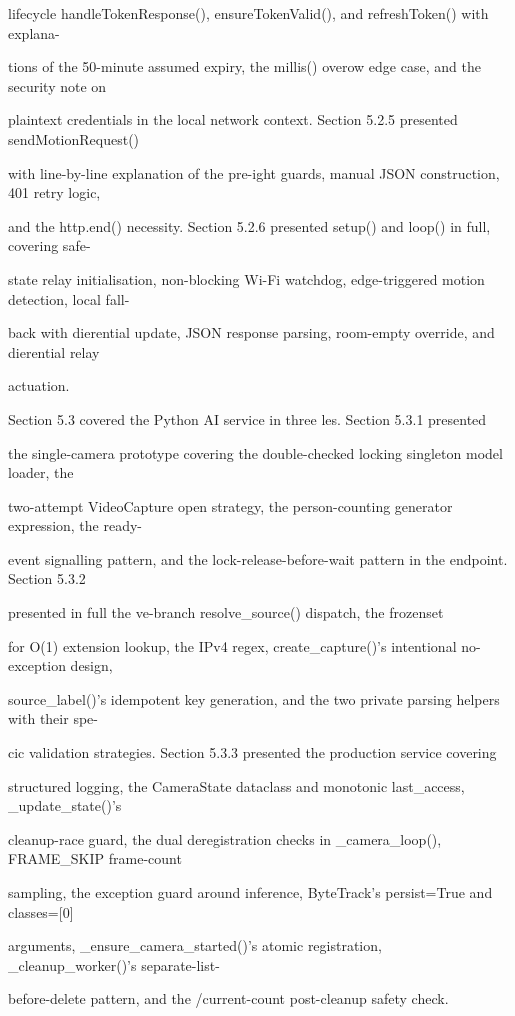 lifecycle  handleTokenResponse(), ensureTokenValid(), and refreshToken()  with explana-

tions of the 50-minute assumed expiry, the millis() overow edge case, and the security note on

plaintext credentials in the local network context. Section 5.2.5 presented sendMotionRequest()

with line-by-line explanation of the pre-ight guards, manual JSON construction, 401 retry logic,

and the http.end() necessity. Section 5.2.6 presented setup() and loop() in full, covering safe-

state relay initialisation, non-blocking Wi-Fi watchdog, edge-triggered motion detection, local fall-

back with dierential update, JSON response parsing, room-empty override, and dierential relay

actuation.

Section 5.3 covered the Python AI service in three les. Section 5.3.1 presented

the single-camera prototype  covering the double-checked locking singleton model loader, the

two-attempt VideoCapture open strategy, the person-counting generator expression, the ready-

event signalling pattern, and the lock-release-before-wait pattern in the endpoint. Section 5.3.2

presented in full  the ve-branch resolve\_source() dispatch, the frozenset

for O(1) extension lookup, the IPv4 regex, create\_capture()'s intentional no-exception design,

source\_label()'s idempotent key generation, and the two private parsing helpers with their spe-

cic validation strategies. Section 5.3.3 presented  the production service  covering

structured logging, the CameraState dataclass and monotonic last\_access, \_update\_state()'s

cleanup-race guard, the dual deregistration checks in \_camera\_loop(), FRAME\_SKIP frame-count

sampling, the exception guard around inference, ByteTrack's persist=True and classes=[0]

arguments, \_ensure\_camera\_started()'s atomic registration, \_cleanup\_worker()'s separate-list-

before-delete pattern, and the /current-count post-cleanup safety check.

